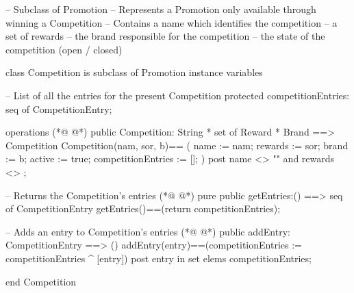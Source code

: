 \begin{vdmpp}[breaklines=true]
-- Subclass of Promotion
-- Represents a Promotion only available through winning a Competition
-- Contains a name which identifies the competition
--      a set of rewards
--          the brand responsible for the competition
--      the state of the competition (open / closed)

class Competition is subclass of Promotion   
 instance variables
   
  -- List of all the entries for the present Competition
  protected competitionEntries: seq of CompetitionEntry;

 operations
(*@
\label{Competition:15}
@*)
  public Competition: String * set of Reward * Brand ==> Competition
  Competition(nam, sor, b)== 
  (
    name := nam;
    rewards := sor;
    brand := b;
    active := true;
    competitionEntries := [];
  )
  post name <> "" and rewards <> {};
    
   -- Returns the Competition's entries
(*@
\label{getEntries:27}
@*)
  pure public getEntries:() ==> seq of CompetitionEntry
    getEntries()==(return competitionEntries);  

  -- Adds an entry to Competition's entries
(*@
\label{addEntry:31}
@*)
   public addEntry: CompetitionEntry ==> ()
   addEntry(entry)==(competitionEntries := competitionEntries ^ [entry])
   post entry in set elems competitionEntries;

end Competition
\end{vdmpp}
